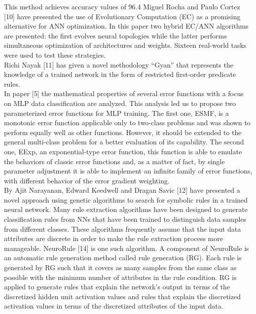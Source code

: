 \documentclass[a4paper,14pt,onecolumn]{article}
\begin{document}
     This method achieves accuracy values of 96.4%
     Miguel Rocha and Paulo Cortez [10] have presented the use of Evolutionary Computation (EC) as a promising alternative for ANN optimization. In this paper two hybrid EC/ANN algorithms are presented: the first evolves neural topologies while the latter performs simultaneous optimization of architectures and weights. Sixteen real-world tasks were used to test these strategies. \\
      Richi Nayak [11] has given a novel methodology “Gyan” that represents the knowledge of a trained network in the form of restricted first-order predicate rules. \\
      In paper [5] the mathematical properties of several error functions with a focus on MLP data classification are analyzed. This analysis led us to propose two parameterized error functions for MLP training. The first one, ESMF, is a monotonic error function applicable only to two-class problems and was shown to perform equally well as other functions. However, it should be extended to the general multi-class problem for a better evaluation of its capability. The second one, EExp, an exponential-type error function, this function is able to emulate the behaviors of classic error functions and, as a matter of fact, by single parameter adjustment it is able to implement an infinite family of error functions, with different behavior of the error gradient weighting.\\
       By Ajit Narayanan, Edward Keedwell and Dragan Savic [12] have presented a novel approach using genetic algorithms to search for symbolic rules in a trained neural network.       Many rule extraction algorithms have been designed to generate classification rules from NNs that have been trained to distinguish data samples from different classes. These algorithms frequently assume that the input data attributes are discrete in order to make the rule extraction process more manageable. NeuroRule [14] is one such algorithm. A component of NeuroRule is an automatic rule generation method called rule generation (RG). Each rule is generated by RG such that it covers as many samples from the same class as possible with the minimum number of attributes in the rule condition. RG is applied to generate rules that explain the network’s output in terms of the discretized hidden unit activation values and rules that explain the discretized activation values in terms of the discretized attributes of the input data.\\
\end{document}
